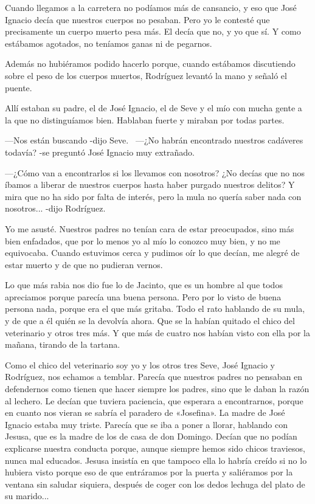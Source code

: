 \documentclass{barcodevapor3pags}
\begin{document}
Cuando llegamos a la carretera no podíamos más de cansancio, y eso que
José Ignacio decía que nuestros cuerpos no pesaban. Pero yo le contesté
que precisamente un cuerpo muerto pesa más. El decía que no, y yo que
sí. Y como estábamos agotados, no teníamos ganas ni de pegarnos.~

Además no hubiéramos podido hacerlo porque, cuando estábamos discutiendo
sobre el peso de los cuerpos muertos, Rodríguez levantó la mano y señaló
el puente.~

Allí estaban su padre, el de José Ignacio, el de Seve y el mío con mucha
gente a la que no distinguíamos bien. Hablaban fuerte y miraban por
todas partes.~


---Nos están buscando -dijo Seve.~
---¿No habrán encontrado nuestros cadáveres todavía? -se preguntó José
Ignacio muy extrañado.~

---¿Cómo van a encontrarlos si los llevamos con nosotros? ¿No decías que
no nos íbamos a liberar de nuestros cuerpos hasta haber purgado nuestros
delitos? Y mira que no ha sido por falta de interés, pero la mula no
quería saber nada con nosotros... -dijo Rodríguez.~

Yo me asusté. Nuestros padres no tenían cara de estar preocupados, sino
más bien enfadados, que por lo menos yo al mío lo conozco muy bien, y no
me equivocaba. Cuando estuvimos cerca y pudimos oír lo que decían, me
alegré de estar muerto y de que no pudieran vernos.~

Lo que más rabia nos dio fue lo de Jacinto, que es un hombre al que
todos apreciamos porque parecía una buena persona. Pero por lo visto de
buena persona nada, porque era el que más gritaba. Todo el rato hablando
de su mula, y de que a él quién se la devolvía ahora. Que se la habían
quitado el chico del veterinario y otros tres más. Y que más de cuatro
nos habían visto con ella por la mañana, tirando de la tartana.~

Como el chico del veterinario soy yo y los otros tres Seve, José Ignacio
y Rodríguez, nos echamos a temblar. Parecía que nuestros padres no
pensaban en defendernos como tienen que hacer siempre los padres, sino
que le daban la razón al lechero. Le decían que tuviera paciencia, que
esperara a encontrarnos, porque en cuanto nos vieran se sabría el
paradero de «Josefina». La madre de José Ignacio estaba muy triste. Parecía que se iba a poner a
llorar, hablando con Jesusa, que es la madre de los de casa de don
Domingo. Decían que no podían explicarse nuestra conducta porque, aunque
siempre hemos sido chicos traviesos, nunca mal educados. Jesusa insistía
en que tampoco ella lo habría creído si no lo hubiera visto porque eso
de que entráramos por la puerta y saliéramos por la ventana sin saludar
siquiera, después de coger con los dedos lechuga del plato de su
marido...~
\end{document}
